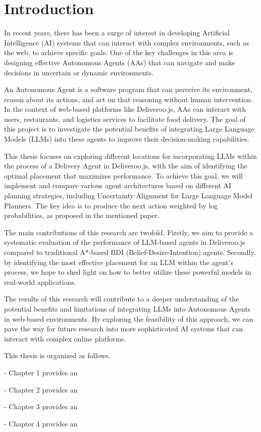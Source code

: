\chapter{Introduction}
\label{cha:examples}

In recent years, there has been a surge of interest in developing Artificial Intelligence
(AI) systems that can interact with complex environments, such as the web, to achieve
specific goals. One of the key challenges in this area is designing effective
Autonomous Agents (AAs) that can navigate and make decisions in uncertain or
dynamic environments.

An Autonomous Agent is a software program that can perceive its environment, reason
about its actions, and act on that reasoning without human intervention. In the context
of web-based platforms like Deliveroo.js, AAs can interact with users, restaurants,
and logistics services to facilitate food delivery. The goal of this project is to
investigate the potential benefits of integrating Large Language Models (LLMs) into
these agents to improve their decision-making capabilities.

This thesis focuses on exploring different locations for incorporating LLMs within
the process of a Delivery Agent in Deliveroo.js, with the aim of identifying the
optimal placement that maximizes performance. To achieve this goal, we will
implement and compare various agent architectures based on different AI planning
strategies, including Uncertainty Alignment for Large Language Model Planners.
The key idea is to produce the next action weighted by log probabilities, as proposed
in the mentioned paper.

The main contributions of this research are twofold. Firstly, we aim to provide a
systematic evaluation of the performance of LLM-based agents in Deliveroo.js compared
to traditional A*-based BDI (Belief-Desire-Intention) agents. Secondly, by
identifying the most effective placement for an LLM within the agent's process, we
hope to shed light on how to better utilize these powerful models in real-world applications.

The results of this research will contribute to a deeper understanding of the potential
benefits and limitations of integrating LLMs into Autonomous Agents in web-based
environments. By exploring the feasibility of this approach, we can pave the way
for future research into more sophisticated AI systems that can interact with complex
online platforms.

This thesis is organized as follows.

- Chapter 1 provides an

- Chapter 2 provides an

- Chapter 3 provides an

- Chapter 4 provides an